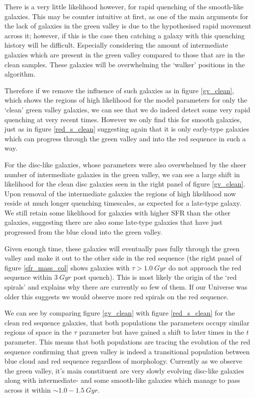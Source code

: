 \documentclass{mn2e}
\begin{document}
There is a very little likelihood however, for rapid quenching of the smooth-like galaxies. This may be counter intuitive at first, as one of the main arguments for the lack of galaxies in the green valley is due to the hypothesised rapid movement across it; however, if this is the case then catching a galaxy with this quenching history will be difficult. Especially considering the amount of intermediate galaxies which are present in the green valley compared to those that are in the clean samples. These galaxies will be overwhelming the `walker' positions in the algorithm. 

Therefore if we remove the influence of such galaxies as in figure \ref{gv_clean}, which shows the regions of high likelihood for the model parameters for only the `clean' green valley galaxies, we can see that we do indeed detect some very rapid quenching at very recent times. However we only find this for smooth galaxies, just as in figure \ref{red_s_clean} suggesting again that it is only early-type galaxies which can progress through the green valley and into the red sequence in such a way. 

For the disc-like galaxies, whose parameters were also overwhelmed by the sheer number of intermediate galaxies in the green valley, we can see a large shift in likelihood for the clean disc galaxies seen in the right panel of figure \ref{gv_clean}. Upon removal of the intermediate galaxies the regions of high likelihood now reside at much longer quenching timescales, as expected for a late-type galaxy.  We still retain some likelihood for galaxies with higher SFR than the other galaxies, suggesting there are also some late-type galaxies that have just progressed from the blue cloud into the green valley. 

Given enough time, these galaxies will eventually pass fully through the green valley and make it out to the other side in the red sequence (the right panel of figure \ref{sfr_mass_col} shows galaxies with $\tau > 1.0~Gyr$ do not approach the red sequence within $3~Gyr$ post quench). This is most likely the origin of the `red spirals' and explains why there are currently so few of them. If our Universe was older this suggests we would observe more red spirals on the red sequence. 

We can see by comparing figure \ref{gv_clean} with figure \ref{red_s_clean} for the clean red sequence galaxies, that both populations the parameters occupy similar regions of space in the $\tau$ parameter but have gained a shift to later times in the $t$ parameter. This means that both populations are tracing the evolution of the red sequence confirming that green valley is indeed a transitional population between blue cloud and red sequence regardless of morphology. Currently as we observe the green valley, it's main constituent are very slowly evolving disc-like galaxies along with intermediate- and some smooth-like galaxies which manage to pass across it within $\sim 1.0-1.5~Gyr$.
\end{document}
